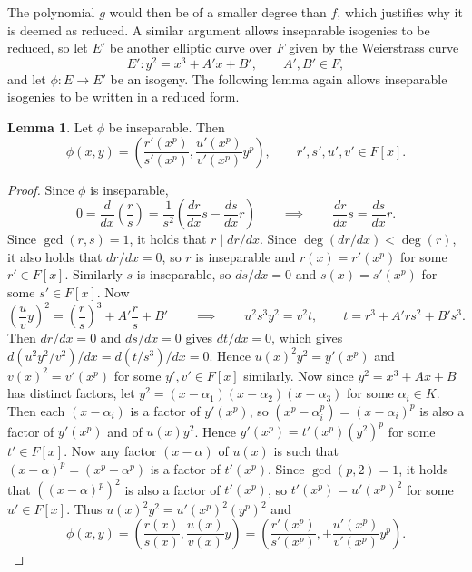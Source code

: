 \documentclass{article}
\newcommand{\rb}[1]{\left( #1 \right)}
\renewcommand{\sb}[1]{\left[ #1 \right]}
\theoremstyle{definition}
\newtheorem{lemma}[proposition]{Lemma}
\begin{document}
The polynomial $ g $ would then be of a smaller degree than $ f $, which justifies why it is deemed as reduced. A similar argument allows inseparable isogenies to be reduced, so let $ E' $ be another elliptic curve over $ F $ given by the Weierstrass curve
$$ E' : y^2 = x^3 + A'x + B', \qquad A', B' \in F,  $$
and let $ \phi : E \to E' $ be an isogeny. The following lemma again allows inseparable isogenies to be written in a reduced form.

\begin{lemma}
Let $ \phi $ be inseparable. Then
$$ \phi\rb{x, y} = \rb{\dfrac{r'\rb{x^p}}{s'\rb{x^p}}, \dfrac{u'\rb{x^p}}{v'\rb{x^p}}y^p}, \qquad r', s', u', v' \in F\sb{x}. $$
\end{lemma}

\begin{proof}
Since $ \phi $ is inseparable,
$$ 0 = \dfrac{d}{dx}\rb{\dfrac{r}{s}} = \dfrac{1}{s^2}\rb{\dfrac{dr}{dx}s - \dfrac{ds}{dx}r} \qquad \implies \qquad \dfrac{dr}{dx}s = \dfrac{ds}{dx}r. $$
Since $ \gcd\rb{r, s} = 1 $, it holds that $ r \mid dr / dx $. Since $ \deg\rb{dr / dx} < \deg\rb{r} $, it also holds that $ dr / dx = 0 $, so $ r $ is inseparable and $ r\rb{x} = r'\rb{x^p} $ for some $ r' \in F\sb{x} $. Similarly $ s $ is inseparable, so $ ds / dx = 0 $ and $ s\rb{x} = s'\rb{x^p} $ for some $ s' \in F\sb{x} $. Now
$$ \rb{\dfrac{u}{v}y}^2 = \rb{\dfrac{r}{s}}^3 + A'\dfrac{r}{s} + B' \qquad \implies \qquad u^2s^3y^2 = v^2t, \qquad t = r^3 + A'rs^2 + B's^3. $$
Then $ dr / dx = 0 $ and $ ds / dx = 0 $ gives $ dt / dx = 0 $, which gives $ d\rb{u^2y^2 / v^2} / dx = d\rb{t / s^3} / dx = 0 $. Hence $ u\rb{x}^2y^2 = y'\rb{x^p} $ and $ v\rb{x}^2 = v'\rb{x^p} $ for some $ y', v' \in F\sb{x} $ similarly. Now since $ y^2 = x^3 + Ax + B $ has distinct factors, let $ y^2 = \rb{x - \alpha_1}\rb{x - \alpha_2}\rb{x - \alpha_3} $ for some $ \alpha_i \in K $. Then each $ \rb{x - \alpha_i} $ is a factor of $ y'\rb{x^p} $, so $ \rb{x^p - \alpha_i^p} = \rb{x - \alpha_i}^p $ is also a factor of $ y'\rb{x^p} $ and of $ u\rb{x}y^2 $. Hence $ y'\rb{x^p} = t'\rb{x^p}\rb{y^2}^p $ for some $ t' \in F\sb{x} $. Now any factor $ \rb{x - \alpha} $ of $ u\rb{x} $ is such that $ \rb{x - \alpha}^p = \rb{x^p - \alpha^p} $ is a factor of $ t'\rb{x^p} $. Since $ \gcd\rb{p, 2} = 1 $, it holds that $ \rb{\rb{x - \alpha}^p}^2 $ is also a factor of $ t'\rb{x^p} $, so $ t'\rb{x^p} = u'\rb{x^p}^2 $ for some $ u' \in F\sb{x} $. Thus $ u\rb{x}^2y^2 = u'\rb{x^p}^2\rb{y^p}^2 $ and
$$ \phi\rb{x, y} = \rb{\dfrac{r\rb{x}}{s\rb{x}}, \dfrac{u\rb{x}}{v\rb{x}}y} = \rb{\dfrac{r'\rb{x^p}}{s'\rb{x^p}}, \pm\dfrac{u'\rb{x^p}}{v'\rb{x^p}}y^p}. $$
\end{proof}
\end{document}
